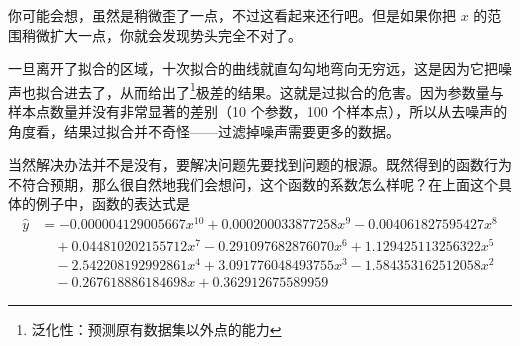 你可能会想，虽然是稍微歪了一点，不过这看起来还行吧。但是如果你把 $x$ 的范围稍微扩大一点，你就会发现势头完全不对了。
\begin{figure}[H]
    \centering
\end{figure}

一旦离开了拟合的区域，十次拟合的曲线就直勾勾地弯向无穷远，这是因为它把噪声也拟合进去了，从而给出了\footnote{泛化性：预测原有数据集以外点的能力}极差的结果。这就是过拟合的危害。因为参数量与样本点数量并没有非常显著的差别（10 个参数，100 个样本点），所以从去噪声的角度看，结果过拟合并不奇怪——过滤掉噪声需要更多的数据。

当然解决办法并不是没有，要解决问题先要找到问题的根源。既然得到的函数行为不符合预期，那么很自然地我们会想问，这个函数的系数怎么样呢？在上面这个具体的例子中，函数的表达式是
\[
    \begin{aligned}
        \hat y & = -0.000004129005667 x^{10} + 0.000200033877258 x^9 - 0.004061827595427 x^8   \\
               & \quad + 0.044810202155712 x^7 - 0.291097682876070 x^6 + 1.129425113256322 x^5 \\
               & \quad - 2.542208192992861 x^4 + 3.091776048493755 x^3 - 1.584353162512058 x^2 \\
               & \quad - 0.267618886184698 x + 0.362912675589959
    \end{aligned}
\]

